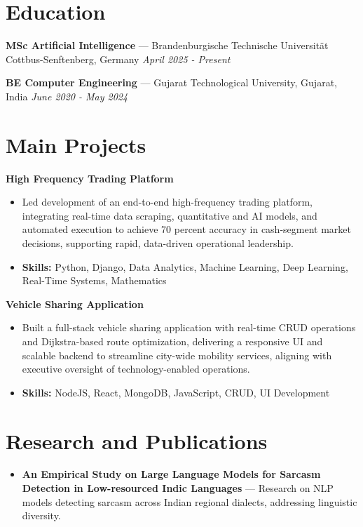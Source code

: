 \documentclass[a4paper,10pt]{article}
\begin{document}
\section*{Education}
\textbf{MSc Artificial Intelligence} — Brandenburgische Technische Universität Cottbus-Senftenberg, Germany \hfill \textit{April 2025 - Present}\par
\vspace{1.5pt}
\textbf{BE Computer Engineering} — Gujarat Technological University, Gujarat, India \hfill \textit{June 2020 - May 2024}\par

\section*{Main Projects}
\textbf{High Frequency Trading Platform}\par
\vspace{1pt}
\begin{itemize}
  \item Led development of an end-to-end high-frequency trading platform, integrating real-time data scraping, quantitative and AI models, and automated execution to achieve 70 percent accuracy in cash-segment market decisions, supporting rapid, data-driven operational leadership.
  \item \textbf{Skills:} Python, Django, Data Analytics, Machine Learning, Deep Learning, Real-Time Systems, Mathematics
\end{itemize}
\vspace{3pt}
\textbf{Vehicle Sharing Application}\par
\vspace{1pt}
\begin{itemize}
  \item Built a full-stack vehicle sharing application with real-time CRUD operations and Dijkstra-based route optimization, delivering a responsive UI and scalable backend to streamline city-wide mobility services, aligning with executive oversight of technology-enabled operations.
  \item \textbf{Skills:} NodeJS, React, MongoDB, JavaScript, CRUD, UI Development
\end{itemize}

\section*{Research and Publications}
\begin{itemize}
\item \textbf{An Empirical Study on Large Language Models for Sarcasm Detection in Low-resourced Indic Languages} — Research on NLP models detecting sarcasm across Indian regional dialects, addressing linguistic diversity.
\end{itemize}
\end{document}
